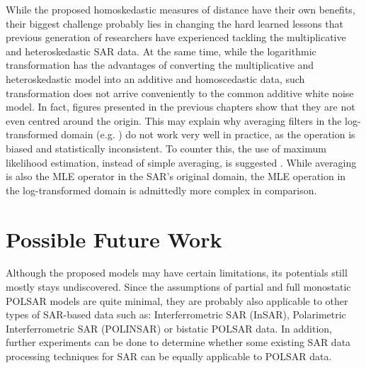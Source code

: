 While
                the proposed homoskedastic measures of distance have
                their own benefits, their biggest challenge probably
                lies in changing the hard learned lessons that
                previous generation of researchers have experienced tackling
                the multiplicative and heteroskedastic SAR data.
At
                the same time, while the logarithmic transformation has
                the advantages of converting the multiplicative and
                heteroskedastic model into an additive and homoscedastic
                data, such transformation does not arrive conveniently
                to the common additive white noise model.
In fact, figures presented in the previous chapters show that 
	they are not even centred around the origin. 
This may explain why averaging filters in the log-transformed domain (e.g. \cite{Arsenault_JOptSocAm_1976}) do not 
	work very well in practice, as the operation is biased and statistically inconsistent.
To counter this, the use of maximum likelihood estimation, instead of simple averaging, 
	is suggested \cite{Le_2011_ACRS}.
While averaging is also the MLE operator in the SAR's original domain,
                the MLE operation in the log-transformed domain is admittedly more complex in comparison.

\section{Possible Future Work}
\label{sec:conclusion_future_work}


Although
                the proposed models may have certain limitations, its
                potentials still mostly stays undiscovered.
Since
                the assumptions of partial and full monostatic POLSAR
                models are quite minimal, they are probably also
                applicable to other types of SAR-based data such as: Interferrometric SAR (InSAR), Polarimetric Interferrometric SAR (POLINSAR) 
                or bistatic POLSAR data.
In addition, further experiments can be done to determine whether some existing SAR data processing techniques for SAR can be equally applicable to POLSAR data.

